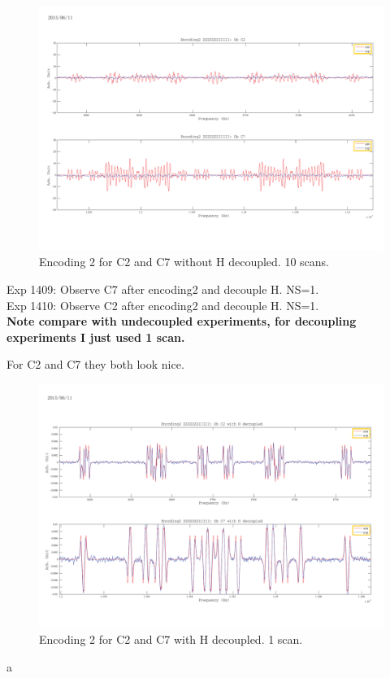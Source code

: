 \begin{figure}[htb]
\begin{center}
\includegraphics[width=\columnwidth]{Encoding2_without_decouple.pdf}
\end{center}
\setlength{\abovecaptionskip}{-0.35cm}
\caption{\footnotesize{Encoding 2 for C2 and C7 without H decoupled. 10 scans.}}\label{1407and1408}
\end{figure}

\clearpage
Exp 1409: Observe C7 after encoding2 and decouple H. NS=1.\\
Exp 1410: Observe C2 after encoding2 and decouple H. NS=1.\\
\textbf{Note compare with undecoupled experiments, for decoupling experiments I just used 1 scan.}

For C2 and C7 they both look nice.

\begin{figure}[htb]
\begin{center}
\includegraphics[width=\columnwidth]{Encoding2_with_decouple.pdf}
\end{center}
\setlength{\abovecaptionskip}{-0.35cm}
\caption{\footnotesize{Encoding 2 for C2 and C7 with H decoupled. 1 scan.}}\label{1409and1410}
\end{figure}a

